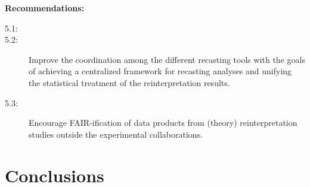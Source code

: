 \documentclass[11pt]{article}
\begin{document}
\noindent
\textbf{Recommendations:}
\begin{description}
   \item[5.1:] 
   \item[5.2:] Improve the coordination among the different recasting tools with the goals of achieving a centralized framework for recasting analyses and unifying the statistical treatment of the reinterpretation results.
   \item[5.3:] Encourage FAIR-ification of data products from (theory) reinterpretation studies outside the experimental collaborations. %
\end{description}
\section{Conclusions}

\def\thefootnote{\fnsymbol{footnote}}
\setcounter{footnote}{0}




\end{document}
